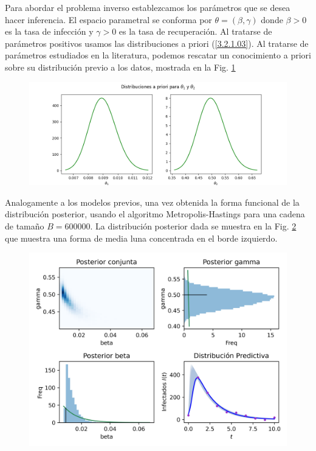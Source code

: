 Para abordar el problema inverso establezcamos los parámetros que se desea hacer inferencia. El espacio parametral se conforma por $\theta = (\beta,\gamma)$ donde $\beta >0$ es la tasa de infección y $\gamma > 0$ es la tasa de recuperación. Al tratarse de parámetros positivos usamos las distribuciones a priori (\ref{3.2.1.03}). Al tratarse de parámetros estudiados en la literatura, podemos rescatar un conocimiento a priori sobre su distribución previo a los datos, mostrada en la Fig. \ref{Fig. SIR_02} 

\begin{figure}[H] 
    \centering 
    \includegraphics[width = 15 cm ]{img/Exp_Central_SIR_sigma/Figuras/Generales/Apriori_SIR_sigma.png} 
    \label{Fig. SIR_02}
\end{figure} 

Analogamente a los modelos previos, una vez obtenida la forma funcional de la distribución posterior, usando el algoritmo Metropolis-Hastings para una cadena de tamaño $B = 600000$. La distribución posterior dada se muestra en la Fig. \ref{Fig. SIR_03} que muestra una forma de media luna concentrada en el borde izquierdo. 

\begin{figure}[H] 
    \centering 
    \includegraphics[width = 10 cm]{img/Exp_Central_SIR_sigma/Figuras/Generales/Resumen_SIR_sigma.png} 
    \label{Fig. SIR_03}
\end{figure} 

